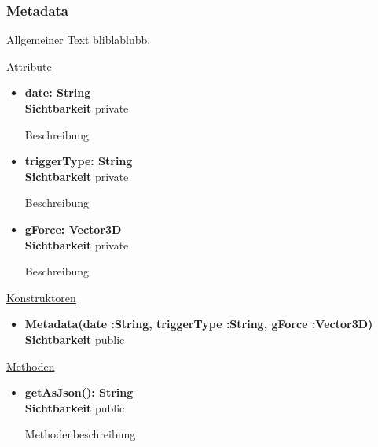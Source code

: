 \subsubsection{Metadata}
Allgemeiner Text bliblablubb. \newline

\underline{Attribute}
\begin{itemize}
\itemsep0pt
\item \textbf{date: String} \hfill\\ 
\textbf{Sichtbarkeit} private 

Beschreibung

\item \textbf{triggerType: String} \hfill\\ 
\textbf{Sichtbarkeit} private 

Beschreibung

\item \textbf{gForce: Vector3D} \hfill\\ 
\textbf{Sichtbarkeit} private 

Beschreibung

\end{itemize}

\underline{Konstruktoren}
\begin{itemize}
\itemsep0pt
\item \textbf{Metadata(date :String, triggerType :String, gForce :Vector3D)} \hfill\\
\textbf{Sichtbarkeit} public 

\end{itemize}

\underline{Methoden}
\begin{itemize}
\itemsep0pt
\item \textbf{getAsJson(): String}\hfill\\
\textbf{Sichtbarkeit} public 

Methodenbeschreibung

\end{itemize}